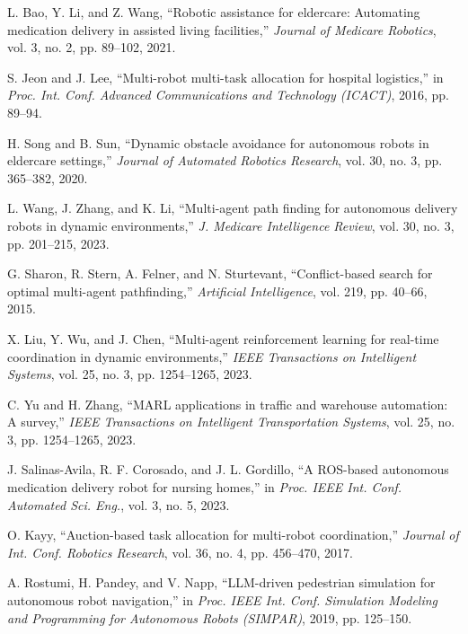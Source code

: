 \documentclass[conference]{IEEEtran}
\begin{document}
\begin{thebibliography}{1}

L. Bao, Y. Li, and Z. Wang, ``Robotic assistance for eldercare: Automating medication delivery in assisted living facilities,'' \emph{Journal of Medicare Robotics}, vol. 3, no. 2, pp. 89--102, 2021.

S. Jeon and J. Lee, ``Multi-robot multi-task allocation for hospital logistics,'' in \emph{Proc. Int. Conf. Advanced Communications and Technology (ICACT)}, 2016, pp. 89--94.

H. Song and B. Sun, ``Dynamic obstacle avoidance for autonomous robots in eldercare settings,'' \emph{Journal of Automated Robotics Research}, vol. 30, no. 3, pp. 365--382, 2020.

L. Wang, J. Zhang, and K. Li, ``Multi-agent path finding for autonomous delivery robots in dynamic environments,'' \emph{J. Medicare Intelligence Review}, vol. 30, no. 3, pp. 201--215, 2023.

G. Sharon, R. Stern, A. Felner, and N. Sturtevant, ``Conflict-based search for optimal multi-agent pathfinding,'' \emph{Artificial Intelligence}, vol. 219, pp. 40--66, 2015.

X. Liu, Y. Wu, and J. Chen, ``Multi-agent reinforcement learning for real-time coordination in dynamic environments,'' \emph{IEEE Transactions on Intelligent Systems}, vol. 25, no. 3, pp. 1254--1265, 2023.

C. Yu and H. Zhang, ``MARL applications in traffic and warehouse automation: A survey,'' \emph{IEEE Transactions on Intelligent Transportation Systems}, vol. 25, no. 3, pp. 1254--1265, 2023.

J. Salinas-Avila, R. F. Corosado, and J. L. Gordillo, ``A ROS-based autonomous medication delivery robot for nursing homes,'' in \emph{Proc. IEEE Int. Conf. Automated Sci. Eng.}, vol. 3, no. 5, 2023.

O. Kayy, ``Auction-based task allocation for multi-robot coordination,'' \emph{Journal of Int. Conf. Robotics Research}, vol. 36, no. 4, pp. 456--470, 2017.

A. Rostumi, H. Pandey, and V. Napp, ``LLM-driven pedestrian simulation for autonomous robot navigation,'' in \emph{Proc. IEEE Int. Conf. Simulation Modeling and Programming for Autonomous Robots (SIMPAR)}, 2019, pp. 125--150.


\end{thebibliography}
\end{document}
